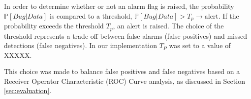 In order to determine whether or not an alarm flag is raised, the
probability $\mathbb{P}[Bug | Data]$ is compared to a threshold, $\mathbb{P}[Bug | Data]
> T_p \to \text{alert}$. If the probability exceeds the threshold
$T_p$, an alert is raised. The choice of the threshold represents a
trade-off between false alarms (false positives) and missed detections
(false negatives). In our implementation $T_P$ was set to a
value of XXXXX.


This choice was made to balance false positives and
false negatives based on a Receiver Operator Characteristic (ROC)
Curve analysis, as discussed in Section \ref{sec:evaluation}.

